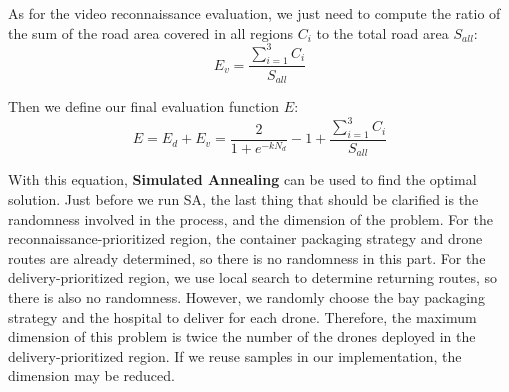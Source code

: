 \documentclass{mcmthesis}
\begin{document}
As for the video reconnaissance evaluation, we just need to compute the ratio of the sum of the road area covered in all regions $C_i$ to the total road area $S_{all}$:
\begin{equation}
    E_v = \frac{\sum_{i=1}^3 C_i}{S_{all}}
    \label{Equ:vrev}
\end{equation}

Then we define our final evaluation function $E$:
\begin{equation}
    E = E_d + E_v = \frac{2}{1+e^{-kN_d}} - 1 + \frac{\sum_{i=1}^3 C_i}{S_{all}}
\end{equation}

With this equation, \textbf{Simulated Annealing} can be used to find the optimal solution. Just before we run SA, the last thing that should be clarified is the randomness involved in the process, and the dimension of the problem. For the reconnaissance-prioritized region, the container packaging strategy and drone routes are already determined, so there is no randomness in this part. For the delivery-prioritized region, we use local search to determine returning routes, so there is also no randomness. However, we randomly choose the bay packaging strategy and the hospital to deliver for each drone. Therefore, the maximum dimension of this problem is twice the number of the drones deployed in the delivery-prioritized region. If we reuse samples in our implementation, the dimension may be reduced.
\end{document}
